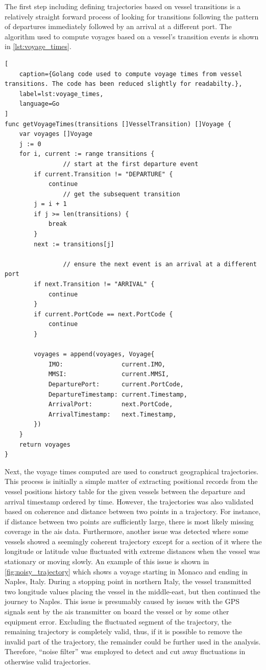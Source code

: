 The first step including defining trajectories based on vessel transitions is a relatively straight forward process of looking for transitions following the pattern of departures immediately followed by an arrival at a different port. The algorithm used to compute voyages based on a vessel's transition events is shown in \cref{lst:voyage_times}.

\begin{lstlisting}[
    caption={Golang code used to compute voyage times from vessel transitions. The code has been reduced slightly for readabilty.},
    label=lst:voyage_times,
    language=Go
]
func getVoyageTimes(transitions []VesselTransition) []Voyage {
	var voyages []Voyage
	j := 0
	for i, current := range transitions {
                // start at the first departure event
		if current.Transition != "DEPARTURE" {
			continue
                // get the subsequent transition
		j = i + 1
		if j >= len(transitions) {
			break
		}
		next := transitions[j]

                // ensure the next event is an arrival at a different port
		if next.Transition != "ARRIVAL" {
			continue
		}
		if current.PortCode == next.PortCode {
			continue
		}

		voyages = append(voyages, Voyage{
			IMO:                current.IMO,
			MMSI:               current.MMSI,
			DeparturePort:      current.PortCode,
			DepartureTimestamp: current.Timestamp,
			ArrivalPort:        next.PortCode,
			ArrivalTimestamp:   next.Timestamp,
		})
	}
	return voyages
}
\end{lstlisting}

Next, the voyage times computed are used to construct geographical trajectories. This process is initially a simple matter of extracting positional records from the vessel positions history table for the given vessels between the departure and arrival timestamp ordered by time. However, the trajectories was also validated based on coherence and distance between two points in a trajectory. For instance, if distance between two points are sufficiently large, there is most likely missing coverage in the \acrshort{ais} data. Furthermore, another issue was detected where some vessels showed a seemingly coherent trajectory except for a section of it where the longitude or latitude value fluctuated with extreme distances when the vessel was stationary or moving slowly. An example of this issue is shown in \cref{fig:noisy_trajectory} which shows a voyage starting in Monaco and ending in Naples, Italy. During a stopping point in northern Italy, the vessel transmitted two longitude values placing the vessel in the middle-east, but then continued the journey to Naples. This issue is presumably caused by issues with the GPS signals sent by the \acrshort{ais} transmitter on board the vessel or by some other equipment error. Excluding the fluctuated segment of the trajectory, the remaining trajectory is completely valid, thus, if it is possible to remove the invalid part of the trajectory, the remainder could be further used in the analysis. Therefore, ``noise filter'' was employed to detect and cut away fluctuations in otherwise valid trajectories.

